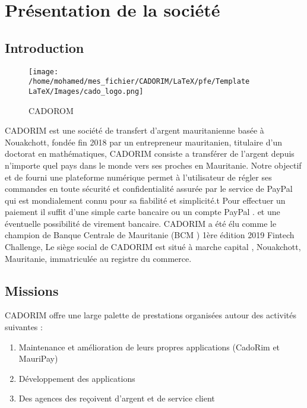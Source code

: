 \chapter{Présentation de la société}
\label{chap:introduction}
\section{Introduction}
\begin{figure}[h]
	\texttt{[image: /home/mohamed/mes\_fichier/CADORIM/LaTeX/pfe/Template LaTeX/Images/cado\_logo.png]}
	\centering
	\caption{CADOROM}
\end{figure}
CADORIM est une société de transfert d’argent mauritanienne basée à Nouakchott,
fondée fin 2018 par un entrepreneur mauritanien, titulaire d'un doctorat en
mathématiques,
CADORIM consiste a transférer de l’argent depuis n’importe quel pays dans le
monde vers ses proches en Mauritanie. Notre objectif et de fourni une plateforme
numérique permet à l’utilisateur de régler ses commandes en toute sécurité et
confidentialité assurée par le service de PayPal qui est mondialement connu pour sa
fiabilité et simplicité.t Pour effectuer un paiement il suffit d'une simple carte bancaire
ou un compte PayPal . et une éventuelle possibilité de virement bancaire.
CADORIM a été élu comme le champion de Banque Centrale de Mauritanie (BCM )
1ère édition 2019 Fintech Challenge,
Le siège social de CADORIM est situé à marche capital , Nouakchott, Mauritanie,
immatriculée au registre du commerce.
\section{Missions}
CADORIM offre une large palette de prestations organisées autour des activités suivantes :
\begin{enumerate}
	
	\item Maintenance et amélioration de leurs propres applications (CadoRim et MauriPay)
	\item Développement des applications 
	\item Des agences des reçoivent d'argent et de service client
	
\end{enumerate}